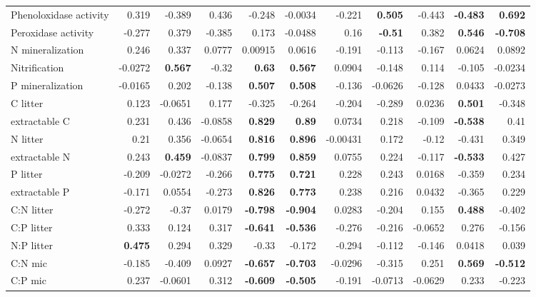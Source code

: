 \documentclass[10pt]{article}
\begin{document}
\begin{flushleft}
\begin{landscape}
\begin{table}[h!]
{\begin{tabular}{lrrrrrrrrrr}
  Phenoloxidase activity & 0.319 & -0.389 & 0.436 & -0.248 & -0.0034 & -0.221 & \textbf{ 0.505 } & -0.443 & \textbf{ -0.483 } & \textbf{ 0.692 } \\ 
  Peroxidase activity & -0.277 & 0.379 & -0.385 & 0.173 & -0.0488 & 0.16 & \textbf{ -0.51 } & 0.382 & \textbf{ 0.546 } & \textbf{ -0.708 } \\ 
  N mineralization & 0.246 & 0.337 & 0.0777 & 0.00915 & 0.0616 & -0.191 & -0.113 & -0.167 & 0.0624 & 0.0892 \\ 
  Nitrification & -0.0272 & \textbf{ 0.567 } & -0.32 & \textbf{ 0.63 } & \textbf{ 0.567 } & 0.0904 & -0.148 & 0.114 & -0.105 & -0.0234 \\ 
  P mineralization & -0.0165 & 0.202 & -0.138 & \textbf{ 0.507 } & \textbf{ 0.508 } & -0.136 & -0.0626 & -0.128 & 0.0433 & -0.0273 \\ 
  C litter & 0.123 & -0.0651 & 0.177 & -0.325 & -0.264 & -0.204 & -0.289 & 0.0236 & \textbf{ 0.501 } & -0.348 \\ 
  extractable C & 0.231 & 0.436 & -0.0858 & \textbf{ 0.829 } & \textbf{ 0.89 } & 0.0734 & 0.218 & -0.109 & \textbf{ -0.538 } & 0.41 \\ 
  N litter & 0.21 & 0.356 & -0.0654 & \textbf{ 0.816 } & \textbf{ 0.896 } & -0.00431 & 0.172 & -0.12 & -0.431 & 0.349 \\ 
  extractable N & 0.243 & \textbf{ 0.459 } & -0.0837 & \textbf{ 0.799 } & \textbf{ 0.859 } & 0.0755 & 0.224 & -0.117 & \textbf{ -0.533 } & 0.427 \\ 
  P litter & -0.209 & -0.0272 & -0.266 & \textbf{ 0.775 } & \textbf{ 0.721 } & 0.228 & 0.243 & 0.0168 & -0.359 & 0.234 \\ 
  extractable P & -0.171 & 0.0554 & -0.273 & \textbf{ 0.826 } & \textbf{ 0.773 } & 0.238 & 0.216 & 0.0432 & -0.365 & 0.229 \\ 
  C:N litter & -0.272 & -0.37 & 0.0179 & \textbf{ -0.798 } & \textbf{ -0.904 } & 0.0283 & -0.204 & 0.155 & \textbf{ 0.488 } & -0.402 \\ 
  C:P litter & 0.333 & 0.124 & 0.317 & \textbf{ -0.641 } & \textbf{ -0.536 } & -0.276 & -0.216 & -0.0652 & 0.276 & -0.156 \\ 
  N:P litter & \textbf{ 0.475 } & 0.294 & 0.329 & -0.33 & -0.172 & -0.294 & -0.112 & -0.146 & 0.0418 & 0.039 \\ 
  C:N mic & -0.185 & -0.409 & 0.0927 & \textbf{ -0.657 } & \textbf{ -0.703 } & -0.0296 & -0.315 & 0.251 & \textbf{ 0.569 } & \textbf{ -0.512 } \\ 
  C:P mic & 0.237 & -0.0601 & 0.312 & \textbf{ -0.609 } & \textbf{ -0.505 } & -0.191 & -0.0713 & -0.0629 & 0.233 & -0.223 \\ 

\end{tabular}}
\end{table}
\end{landscape}
\end{flushleft}
\end{document}
